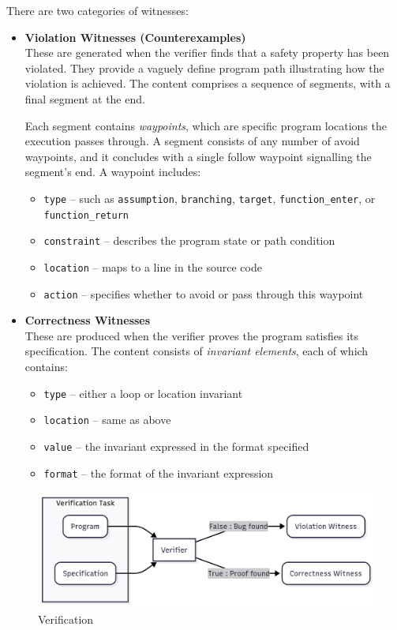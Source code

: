 There are two categories of witnesses:

\begin{itemize}
  \item \textbf{Violation Witnesses (Counterexamples)}~\cite{witness2}~\cite{ViolationWitnessSchema} \\
  These are generated when the verifier finds that a safety property has been violated. 
  They provide a vaguely define program path illustrating how the violation is achieved. 
  The content comprises a sequence of segments, with a final segment at the end.

  Each segment contains \textit{waypoints}, which are specific program locations the execution passes through.
  A segment consists of any number of avoid waypoints, and it concludes with a single
  follow waypoint signalling the segment's end.
  A waypoint includes:
  \begin{itemize}
    \item \texttt{type} – such as \texttt{assumption}, \texttt{branching}, \texttt{target}, \texttt{function\_enter}, or \texttt{function\_return}
    \item \texttt{constraint} – describes the program state or path condition
    \item \texttt{location} – maps to a line in the source code
    \item \texttt{action} – specifies whether to avoid or pass through this waypoint
  \end{itemize}

  \item \textbf{Correctness Witnesses}~\cite{witness2}~\cite{CorrectnesWitnessSchema}\\
  These are produced when the verifier proves the program satisfies its specification. 
  The content consists of \textit{invariant elements}, each of which contains:
  \begin{itemize}
    \item \texttt{type} – either a loop or location invariant
    \item \texttt{location} – same as above
    \item \texttt{value} – the invariant expressed in the format specified
    \item \texttt{format} – the format of the invariant expression 
  \end{itemize}
\end{itemize}

\begin{figure}[h]
  \centering
  \includegraphics[width=1\textwidth]{figures/verifier.png}
  \caption{Verification}
  \label{fig:Verification}
\end{figure}

